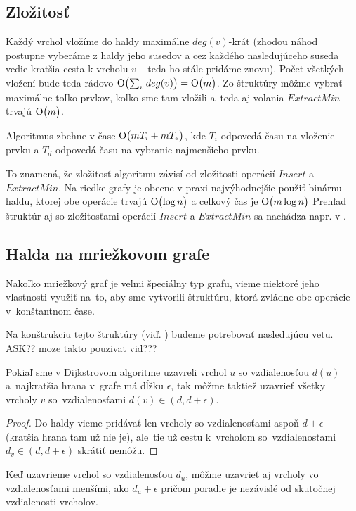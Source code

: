 \subsection{Zložitosť}
Každý vrchol vložíme do haldy maximálne $deg(v)$-krát 
(zhodou náhod postupne vyberáme z haldy jeho susedov a cez každého nasledujúceho suseda vedie kratšia cesta k vrcholu $v$ -- teda ho stále pridáme znovu).
Počet všetkých vložení bude teda rádovo $\operatorname{O}\bigl(\sum_{v}{deg(v)}\bigr) = \operatorname{O}\bigl(m\bigr)$.
Zo štruktúry môžme vybrať maximálne toľko prvkov, koľko sme tam vložili a~teda aj volania $ExtractMin$ trvajú $\operatorname{O}\bigl(m\bigr)$.

Algoritmus zbehne v čase $\operatorname{O}\bigl(m T_i + m T_e\bigr)$, kde $T_i$ odpovedá času na vloženie prvku a $T_d$ odpovedá času na vybranie najmenšieho prvku.

To znamená, že zložitosť algoritmu závisí od zložitosti operácií $Insert$ a $ExtractMin$. Na riedke grafy je obecne v praxi najvýhodnejšie použiť 
binárnu haldu, ktorej obe operácie trvajú $\operatorname{O}\bigl(\log{n} \bigr) $ a celkový čas je 
 $\operatorname{O}\bigl(m\log{n}\bigr)$
Prehľad štruktúr aj so zložitosťami operácií $Insert$ a $ExtractMin$ sa nachádza napr. v \cite{mares07}.

\subsection{Halda na mriežkovom grafe}
Nakoľko mriežkový graf je veľmi špeciálny typ grafu,
vieme niektoré jeho vlastnosti využiť na~to, aby sme vytvorili štruktúru, ktorá zvládne obe operácie v~konštantnom čase. 


Na konštrukciu tejto štruktúry (viď. \cite{gs97}) budeme potrebovať nasledujúcu vetu. ASK?? moze takto pouzivat vid???

\begin{theorem}
\label{dinic-observation}
Pokiaľ sme v Dijkstrovom algoritme uzavreli vrchol $u$ so vzdialenosťou $d(u)$ a~najkratšia hrana v~grafe má dĺžku $\epsilon$, tak môžme taktiež 
uzavrieť všetky vrcholy $v$ so~vzdialenosťami $d(v) \in (d, d + \epsilon)$.
\end{theorem}
\begin{proof}
Do haldy vieme pridávať len vrcholy so vzdialenosťami aspoň $d + \epsilon$ (kratšia hrana tam už nie je), 
ale~tie už cestu k~vrcholom so~vzdialenosťami
$d_v \in (d, d + \epsilon)$ skrátiť nemôžu.
\end{proof}


\begin{consequence}
Keď uzavrieme vrchol so vzdialenosťou $d_u$, môžme uzavrieť aj vrcholy vo vzdialenosťami menšími, ako $d_u + \epsilon$
pričom poradie je nezávislé od skutočnej vzdialenosti vrcholov.
\end{consequence}

